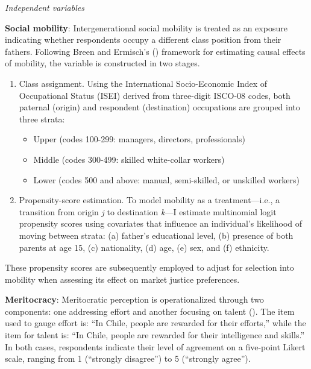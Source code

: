 \documentclass[
  13pt,
]{article}
\providecommand{\tightlist}{%
  \setlength{\itemsep}{0pt}\setlength{\parskip}{0pt}}\usepackage{longtable,booktabs,array}
\begin{document}
\emph{Independent variables}

\textbf{Social mobility}: Intergenerational social mobility is treated
as an exposure indicating whether respondents occupy a different class
position from their fathers. Following Breen and Ermisch's
() framework for estimating
causal effects of mobility, the variable is constructed in two stages.

\begin{enumerate}
\def\labelenumi{\arabic{enumi}.}
\item
  Class assignment. Using the International Socio-Economic Index of
  Occupational Status (ISEI) derived from three-digit ISCO-08 codes,
  both paternal (origin) and respondent (destination) occupations are
  grouped into three strata:

  \begin{itemize}
  \tightlist
  \item
    Upper (codes 100-299: managers, directors, professionals)
  \item
    Middle (codes 300-499: skilled white-collar workers)
  \item
    Lower (codes 500 and above: manual, semi-skilled, or unskilled
    workers)
  \end{itemize}
\item
  Propensity-score estimation. To model mobility as a treatment---i.e.,
  a transition from origin \emph{j} to destination \emph{k}---I estimate
  multinomial logit propensity scores using covariates that influence an
  individual's likelihood of moving between strata: (a) father's
  educational level, (b) presence of both parents at age 15, (c)
  nationality, (d) age, (e) sex, and (f) ethnicity.
\end{enumerate}

These propensity scores are subsequently employed to adjust for
selection into mobility when assessing its effect on market justice
preferences.

\textbf{Meritocracy}: Meritocratic perception is operationalized through
two components: one addressing effort and another focusing on talent
(). The item used to gauge
effort is: ``In Chile, people are rewarded for their efforts,'' while
the item for talent is: ``In Chile, people are rewarded for their
intelligence and skills.'' In both cases, respondents indicate their
level of agreement on a five-point Likert scale, ranging from 1
(``strongly disagree'') to 5 (``strongly agree'').
\end{document}

